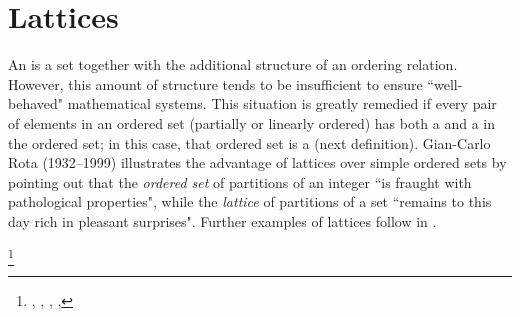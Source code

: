 




\section{Lattices}
An  is a set together with the additional 
structure of an ordering relation.
However, this amount of structure tends to be insufficient to ensure ``well-behaved"
mathematical systems.
This situation is greatly remedied if
every pair of elements in an ordered set (partially or linearly ordered)
has both a  and a   in the ordered set;
in this case, that ordered set is a  (next definition).
Gian-Carlo Rota (1932--1999) illustrates the advantage of lattices over simple ordered sets
by pointing out that the \emph{ordered set} of partitions of an integer 
``is fraught with pathological properties", while 
the \emph{lattice} of partitions of a set 
``remains to this day rich in pleasant surprises".%
Further examples of lattices follow in .

\begin{definition}
\footnote{
  ,
  ,
  , %
  ,
  }
\label{def:lattice}
\label{def:latlin}
\end{definition}


